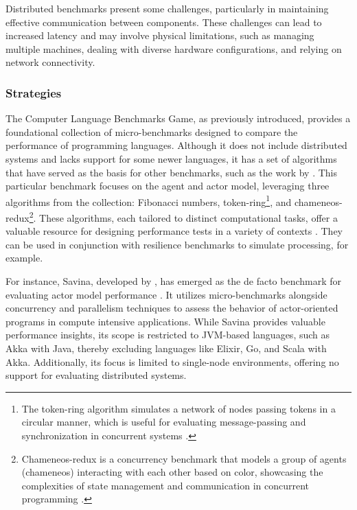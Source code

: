 Distributed benchmarks present some challenges, particularly in maintaining effective communication between components. These challenges can lead to increased latency and may involve physical limitations, such as managing multiple machines, dealing with diverse hardware configurations, and relying on network connectivity.

\subsubsection{Strategies}

The Computer Language Benchmarks Game, as previously introduced, provides a foundational collection of micro-benchmarks designed to compare the performance of programming languages. Although it does not include distributed systems and lacks support for some newer languages, it has a set of algorithms that have served as the basis for other benchmarks, such as the work by \textcite{Cardoso2013}. This particular benchmark focuses on the agent and actor model, leveraging three algorithms from the collection: Fibonacci numbers, token-ring\footnote{The token-ring algorithm simulates a network of nodes passing tokens in a circular manner, which is useful for evaluating message-passing and synchronization in concurrent systems \cite{Cardoso2013}.}, and chameneos-redux\footnote{Chameneos-redux is a concurrency benchmark that models a group of agents (chameneos) interacting with each other based on color, showcasing the complexities of state management and communication in concurrent programming \cite{Cardoso2013}.}. These algorithms, each tailored to distinct computational tasks, offer a valuable resource for designing performance tests in a variety of contexts \cite{Cardoso2013,Randtoul2022}. They can be used in conjunction with resilience benchmarks to simulate processing, for example.

For instance, Savina, developed by \textcite{Imam2014}, has emerged as the de facto benchmark for evaluating actor model performance \cite{Blessing2019}. It utilizes micro-benchmarks alongside concurrency and parallelism techniques to assess the behavior of actor-oriented programs in compute intensive applications. While Savina provides valuable performance insights, its scope is restricted to JVM-based languages, such as Akka with Java, thereby excluding languages like Elixir, Go, and Scala with Akka. Additionally, its focus is limited to single-node environments, offering no support for evaluating distributed systems.

